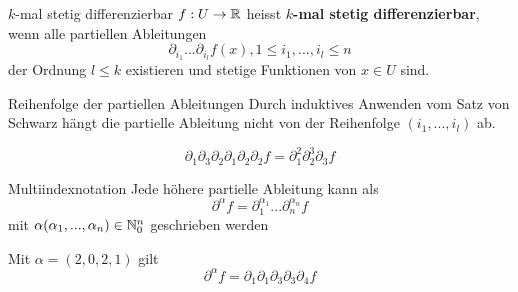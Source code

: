 \begin{definition}{$k$-mal stetig differenzierbar}{}
$f: U \to \mathbb{R}$ heisst \textbf{$k$-mal stetig differenzierbar}, wenn alle partiellen Ableitungen
$$\partial_{i_1} ... \partial_{i_l} f(x), 1 \leq i_1, ..., i_l\leq n$$
der Ordnung $l \leq k$ existieren und stetige Funktionen von $x \in U$ sind.
\end{definition}

\begin{korollar}{Reihenfolge der partiellen Ableitungen}{}
Durch induktives Anwenden vom Satz von Schwarz hängt die partielle Ableitung nicht von der Reihenfolge $(i_1, ..., i_l)$ ab.
\end{korollar}

\begin{example}
$$\partial_1 \partial_3 \partial_2 \partial_1 \partial_2 \partial_2 f = \partial_1^2 \partial_2^3 \partial_3 f$$
\end{example}

\begin{definition}{Multiindexnotation}{}
Jede höhere partielle Ableitung kann als
$$ \partial^\alpha f = \partial_1^{\alpha_1}...\partial_n^{\alpha_n} f$$
mit $\alpha (\alpha_1, ..., \alpha_n) \in \mathbb{N}_0^n$ geschrieben werden
\end{definition}

\begin{example}
Mit $\alpha = (2,0,2,1)$ gilt
$$\partial^\alpha f= \partial_1\partial_1\partial_3\partial_3\partial_4 f$$
\end{example}

